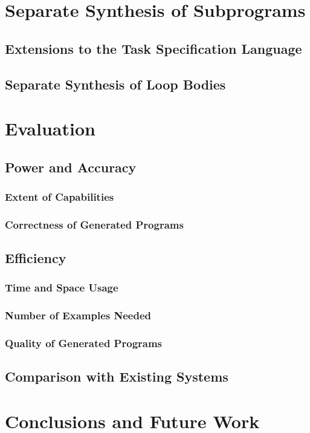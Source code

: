 \documentclass[a4paper,twoside,notitlepage]{report}
\begin{document}
\chapter{Separate Synthesis of Subprograms} \label{chp:gensub}
\section{Extensions to the Task Specification Language}
\section{Separate Synthesis of Loop Bodies}

\chapter{Evaluation}
\section{Power and Accuracy}
\subsection{Extent of Capabilities}
\subsection{Correctness of Generated Programs}
\section{Efficiency}
\subsection{Time and Space Usage}
\subsection{Number of Examples Needed}
\subsection{Quality of Generated Programs}
\section{Comparison with Existing Systems}

\chapter{Conclusions and Future Work}
\end{document}
